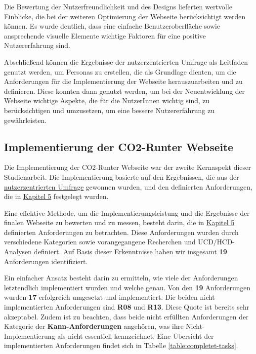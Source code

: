 Die Bewertung der Nutzerfreundlichkeit und des Designs lieferten wertvolle Einblicke, die bei der weiteren Optimierung der Webseite berücksichtigt werden können. Es wurde deutlich, dass eine einfache Benutzeroberfläche sowie ansprechende visuelle Elemente wichtige Faktoren für eine positive Nutzererfahrung sind.

Abschließend können die Ergebnisse der nutzerzentrierten Umfrage als Leitfaden genutzt werden, um Personas zu erstellen, die als Grundlage dienten, um die Anforderungen für die Implementierung der Webseite herauszuarbeiten und zu definieren. Diese konnten dann genutzt werden, um bei der Neuentwicklung der Webseite wichtige Aspekte, die für die NutzerInnen wichtig sind, zu berücksichtigen und umzusetzen, um eine bessere Nutzererfahrung zu gewährleisten.

\subsection{Implementierung der CO2-Runter Webseite}

Die Implementierung der CO2-Runter Webseite war der zweite Kernaspekt dieser Studienarbeit. Die Implementierung basierte auf den Ergebnissen, die aus der \hyperref[chapter:4]{nutzerzentrierten Umfrage} gewonnen wurden, und den definierten Anforderungen, die in \hyperref[chapter:5]{Kapitel 5} festgelegt wurden.

Eine effektive Methode, um die Implementierungsleistung und die Ergebnisse der finalen Webseite zu bewerten und zu messen, besteht darin, die in \hyperref[chapter:5]{Kapitel 5} definierten Anforderungen zu betrachten. Diese Anforderungen wurden durch verschiedene Kategorien sowie vorangegangene Recherchen und \acs{UCD}/\acs{HCD}-Analysen definiert. Auf Basis dieser Erkenntnisse haben wir insgesamt \textbf{19} Anforderungen identifiziert.

Ein einfacher Ansatz besteht darin zu ermitteln, wie viele der Anforderungen letztendlich implementiert wurden und welche genau. Von den \textbf{19} Anforderungen wurden \textbf{17} erfolgreich umgesetzt und implementiert. Die beiden nicht implementierten Anforderungen sind \textbf{R08} und \textbf{R13}. Diese Quote ist bereits sehr akzeptabel. Zudem ist zu beachten, dass beide nicht erfüllten Anforderungen der Kategorie der \textbf{Kann-Anforderungen} angehören, was ihre Nicht-Implementierung als nicht essentiell kennzeichnet. Eine Übersicht der implementierten Anforderungen findet sich in Tabelle \ref{table:completet-tasks}.

